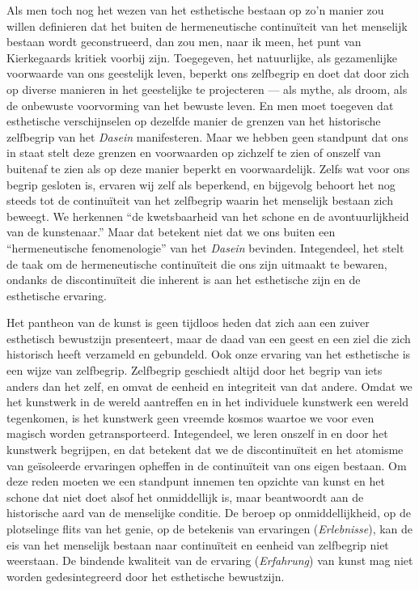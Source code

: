 Als men toch nog het wezen van het esthetische bestaan op zo’n manier zou willen definieren dat het buiten de hermeneutische continuïteit van het menselijk bestaan wordt geconstrueerd, dan zou men, naar ik meen, het punt van Kierkegaards kritiek voorbij zijn. Toegegeven, het natuurlijke, als gezamenlijke voorwaarde van ons geestelijk leven, beperkt ons zelfbegrip en doet dat door zich op diverse manieren in het geestelijke te projecteren — als mythe, als droom, als de onbewuste voorvorming van het bewuste leven. En men moet toegeven dat esthetische verschijnselen op dezelfde manier de grenzen van het historische zelfbegrip van het \textit{Dasein} manifesteren. Maar we hebben geen standpunt dat ons in staat stelt deze grenzen en voorwaarden op zichzelf te zien of onszelf van buitenaf te zien als op deze manier beperkt en voorwaardelijk. Zelfs wat voor ons begrip gesloten is, ervaren wij zelf als beperkend, en bijgevolg behoort het nog steeds tot de continuïteit van het zelfbegrip waarin het menselijk bestaan zich beweegt. We herkennen ``de kwetsbaarheid van het schone en de avontuurlijkheid van de kunstenaar.'' Maar dat betekent niet dat we ons buiten een ``hermeneutische fenomenologie'' van het \textit{Dasein} bevinden. Integendeel, het stelt de taak om de hermeneutische continuïteit die ons zijn uitmaakt te bewaren, ondanks de discontinuïteit die inherent is aan het esthetische zijn en de esthetische ervaring.

Het pantheon van de kunst is geen tijdloos heden dat zich aan een zuiver esthetisch bewustzijn presenteert, maar de daad van een geest en een ziel die zich historisch heeft verzameld en gebundeld. Ook onze ervaring van het esthetische is een wijze van zelfbegrip. Zelfbegrip geschiedt altijd door het begrip van iets anders dan het zelf, en omvat de eenheid en integriteit van dat andere. Omdat we het kunstwerk in de wereld aantreffen en in het individuele kunstwerk een wereld tegenkomen, is het kunstwerk geen vreemde kosmos waartoe we voor even magisch worden getransporteerd. Integendeel, we leren onszelf in en door het kunstwerk begrijpen, en dat betekent dat we de discontinuïteit en het atomisme van geïsoleerde ervaringen opheffen in de continuïteit van ons eigen bestaan. Om deze reden moeten we een standpunt innemen ten opzichte van kunst en het schone dat niet doet alsof het onmiddellijk is, maar beantwoordt aan de historische aard van de menselijke conditie. De beroep op onmiddellijkheid, op de plotselinge flits van het genie, op de betekenis van ervaringen (\textit{Erlebnisse}), kan de eis van het menselijk bestaan naar continuïteit en eenheid van zelfbegrip niet weerstaan. De bindende kwaliteit van de ervaring (\textit{Erfahrung}) van kunst mag niet worden gedesintegreerd door het esthetische bewustzijn.

